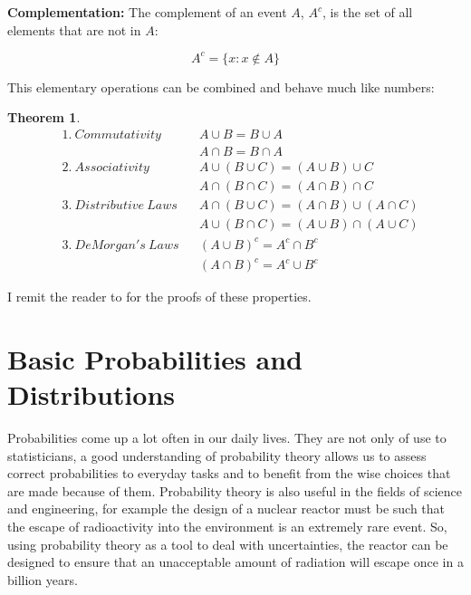 \documentclass[
  oneside,
  11pt, a4paper,
  footinclude=true,
  headinclude=true,
  cleardoublepage=empty
]{scrbook}
\theoremstyle{definition}
\theoremstyle{definition}
\newtheorem{theorem}{Theorem}[section]
\begin{document}
            \textbf{Complementation:} The complement of an event $A$, $A^c$, is the set of all elements that are not in $A$:
            
            \begin{equation}
                A^c = \{x : x \notin A \}
            \end{equation}{}
            
            This elementary operations can be combined and behave much like numbers:
            
            \begin{theorem}{}
            \begin{align*}
                &1.\ Commutativity && A \cup B = B \cup A \\
                &                  && A \cap B = B \cap A \\
                &2.\ Associativity && A \cup (B \cup C) = (A \cup B) \cup C \\
                &                  && A \cap (B \cap C) = (A \cap B) \cap C \\
                &3.\ Distributive\ Laws && A \cap (B \cup C) = (A \cap B) \cup (A \cap C) \\
                &                       && A \cup (B \cap C) = (A \cup B) \cap (A \cup C) \\
                &3.\ DeMorgan's\ Laws && (A \cup B)^c = A^c \cap B^c \\
                &                     && (A \cap B)^c = A^c \cup B^c
            \end{align*}{}
            \end{theorem}
            
            I remit the reader to \cite{CaseBerg:01} for the proofs of these properties.
        
        \section{Basic Probabilities and Distributions}
        
            Probabilities come up a lot often in our daily lives. They are not only of use to statisticians, a good understanding of probability theory allows us to assess correct probabilities to everyday tasks and to benefit from the wise choices that are made because of them. Probability theory is also useful in the fields of science and engineering, for example the design of a nuclear reactor must be such that the escape of radioactivity into the environment is an extremely rare event. So, using probability theory as a tool to deal with uncertainties, the reactor can be designed to ensure that an unacceptable amount of radiation will escape once in a billion years.
            
\end{document}
